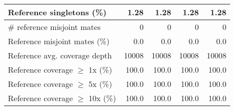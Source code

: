\documentclass[12pt,a4paper]{article}
\begin{document}
\begin{table}[ht]
\begin{center}
\begin{tabular}{|l*{4}{|r}|}
Reference singletons (\%) & 1.28 & 1.28 & 1.28 & 1.28 \\ \hline
\# reference misjoint mates & 0 & 0 & 0 & 0 \\ \hline
Reference misjoint mates (\%) & 0.0 & 0.0 & 0.0 & 0.0 \\ \hline
Reference avg. coverage depth & 10008 & 10008 & 10008 & 10008 \\ \hline
Reference coverage $\geq$ 1x (\%) & 100.0 & 100.0 & 100.0 & 100.0 \\ \hline
Reference coverage $\geq$ 5x (\%) & 100.0 & 100.0 & 100.0 & 100.0 \\ \hline
Reference coverage $\geq$ 10x (\%) & 100.0 & 100.0 & 100.0 & 100.0 \\ \hline
\end{tabular}
\end{center}
\end{table}
\end{document}
